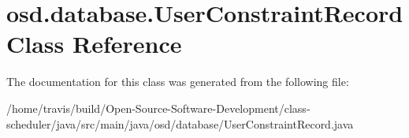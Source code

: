 \hypertarget{classosd_1_1database_1_1_user_constraint_record}{\section{osd.\-database.\-User\-Constraint\-Record Class Reference}
\label{classosd_1_1database_1_1_user_constraint_record}
}


The documentation for this class was generated from the following file\-:\begin{DoxyCompactItemize}
\item 
/home/travis/build/\-Open-\/\-Source-\/\-Software-\/\-Development/class-\/scheduler/java/src/main/java/osd/database/User\-Constraint\-Record.\-java\end{DoxyCompactItemize}
